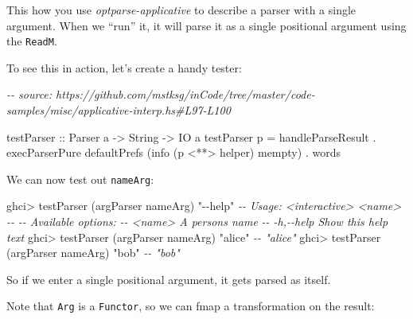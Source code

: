 \documentclass[]{article}
\newenvironment{Shaded}{}{}
\newcommand{\CommentTok}[1]{\textcolor[rgb]{0.38,0.63,0.69}{\textit{#1}}}
\newcommand{\DataTypeTok}[1]{\textcolor[rgb]{0.56,0.13,0.00}{#1}}
\newcommand{\FunctionTok}[1]{\textcolor[rgb]{0.02,0.16,0.49}{#1}}
\newcommand{\NormalTok}[1]{#1}
\newcommand{\OperatorTok}[1]{\textcolor[rgb]{0.40,0.40,0.40}{#1}}
\newcommand{\OtherTok}[1]{\textcolor[rgb]{0.00,0.44,0.13}{#1}}
\newcommand{\StringTok}[1]{\textcolor[rgb]{0.25,0.44,0.63}{#1}}
\begin{document}
This how you use \emph{optparse-applicative} to describe a parser with a single
argument. When we ``run'' it, it will parse it as a single positional argument
using the \texttt{ReadM}.

To see this in action, let's create a handy tester:

\begin{Shaded}
\begin{Highlighting}[]
\CommentTok{{-}{-} source: https://github.com/mstksg/inCode/tree/master/code{-}samples/misc/applicative{-}interp.hs\#L97{-}L100}

\OtherTok{testParser ::} \DataTypeTok{Parser}\NormalTok{ a }\OtherTok{{-}>} \DataTypeTok{String} \OtherTok{{-}>} \DataTypeTok{IO}\NormalTok{ a}
\NormalTok{testParser p }\OtherTok{=}\NormalTok{ handleParseResult}
             \OperatorTok{.}\NormalTok{ execParserPure defaultPrefs (info (p }\OperatorTok{<**>}\NormalTok{ helper) }\FunctionTok{mempty}\NormalTok{)}
             \OperatorTok{.} \FunctionTok{words}
\end{Highlighting}
\end{Shaded}

We can now test out \texttt{nameArg}:

\begin{Shaded}
\begin{Highlighting}[]
\NormalTok{ghci}\OperatorTok{>}\NormalTok{ testParser (argParser nameArg) }\StringTok{"{-}{-}help"}
\CommentTok{{-}{-} Usage: <interactive> <name>}
\CommentTok{{-}{-}}
\CommentTok{{-}{-} Available options:}
\CommentTok{{-}{-}   <name>                   A person\textquotesingle{}s name}
\CommentTok{{-}{-}   {-}h,{-}{-}help                Show this help text}
\NormalTok{ghci}\OperatorTok{>}\NormalTok{ testParser (argParser nameArg) }\StringTok{"alice"}
\CommentTok{{-}{-} "alice"}
\NormalTok{ghci}\OperatorTok{>}\NormalTok{ testParser (argParser nameArg) }\StringTok{"bob"}
\CommentTok{{-}{-} "bob"}
\end{Highlighting}
\end{Shaded}

So if we enter a single positional argument, it gets parsed as itself.

Note that \texttt{Arg} is a \texttt{Functor}, so we can fmap a transformation on
the result:

\begin{Shaded}
\end{Shaded}
\end{document}
